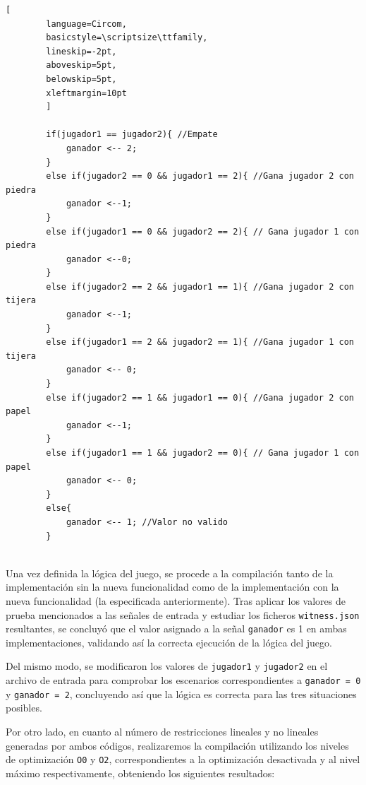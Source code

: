 \documentclass[a4paper,12pt]{report}
\begin{document}
	\vspace{0.3cm}
	\begin{lstlisting}[
		language=Circom,
		basicstyle=\scriptsize\ttfamily, 
		lineskip=-2pt,                  
		aboveskip=5pt,                  
		belowskip=5pt,                  
		xleftmargin=10pt
		]
		
		if(jugador1 == jugador2){ //Empate
			ganador <-- 2;
		}
		else if(jugador2 == 0 && jugador1 == 2){ //Gana jugador 2 con piedra
			ganador <--1;
		}
		else if(jugador1 == 0 && jugador2 == 2){ // Gana jugador 1 con piedra
			ganador <--0;
		}
		else if(jugador2 == 2 && jugador1 == 1){ //Gana jugador 2 con tijera
			ganador <--1;
		}
		else if(jugador1 == 2 && jugador2 == 1){ //Gana jugador 1 con tijera
			ganador <-- 0;
		}
		else if(jugador2 == 1 && jugador1 == 0){ //Gana jugador 2 con papel
			ganador <--1;
		}
		else if(jugador1 == 1 && jugador2 == 0){ // Gana jugador 1 con papel
			ganador <-- 0;
		}
		else{
			ganador <-- 1; //Valor no valido
		}
		
	\end{lstlisting}
	
	\vspace{0.2cm}
	\noindent Una vez definida la lógica del juego, se procede a la compilación tanto de la implementación sin la nueva funcionalidad como de la implementación con la nueva funcionalidad (la especificada anteriormente). Tras aplicar los valores de prueba mencionados a las señales de entrada y estudiar los ficheros \texttt{witness.json} resultantes, se concluyó que el valor asignado a la señal \texttt{ganador} es 1 en ambas implementaciones, validando así la correcta ejecución de la lógica del juego.
	
	\vspace{0.2cm}
	\noindent Del mismo modo, se modificaron los valores de \texttt{jugador1} y \texttt{jugador2} en el archivo de entrada para comprobar los escenarios correspondientes a \texttt{ganador = 0} y \texttt{ganador = 2}, concluyendo así que la lógica es correcta para las tres situaciones posibles.
	
	
	\vspace{0.2cm}
	\noindent Por otro lado, en cuanto al número de restricciones lineales y no lineales generadas por ambos códigos, realizaremos la compilación utilizando los niveles de optimización \texttt{O0} y \texttt{O2}, correspondientes a la optimización desactivada y al nivel máximo respectivamente, obteniendo los siguientes resultados:
	
\end{document}
